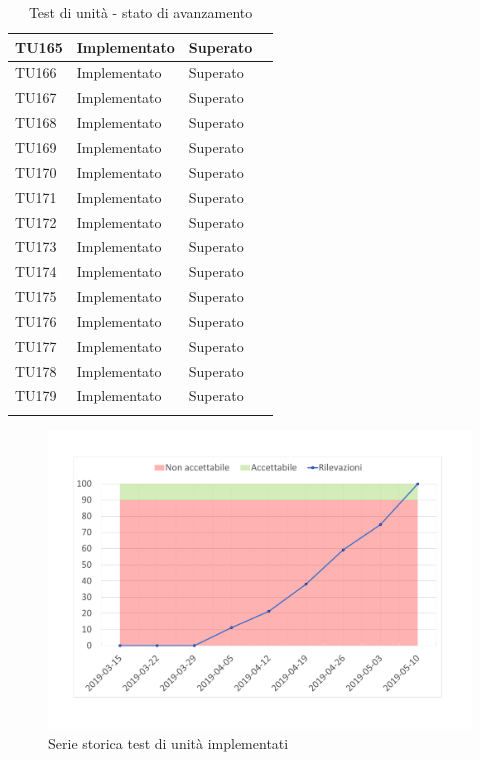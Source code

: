 \begin{longtable}{|>{\centering\arraybackslash}m{1.6cm}|>{\centering\arraybackslash}m{6.41cm}|>{\centering\arraybackslash}m{3.1cm}| c |}
	\rowcolor{LightGray}
	TU165 & Implementato & Superato  \\ \hline
	TU166 & Implementato & Superato  \\ \hline
	\rowcolor{LightGray}
	TU167 & Implementato & Superato  \\ \hline
	TU168 & Implementato & Superato  \\ \hline
	\rowcolor{LightGray}
	TU169 & Implementato & Superato  \\ \hline
	TU170 & Implementato & Superato  \\ \hline
	\rowcolor{LightGray}
	TU171 & Implementato & Superato  \\ \hline
	TU172 & Implementato & Superato  \\ \hline
	\rowcolor{LightGray}
	TU173 & Implementato & Superato  \\ \hline
	TU174 & Implementato & Superato  \\ \hline
	\rowcolor{LightGray}
	TU175 & Implementato & Superato  \\ \hline
	TU176 & Implementato & Superato  \\ \hline
	\rowcolor{LightGray}
	TU177 & Implementato & Superato  \\ \hline
	TU178 & Implementato & Superato  \\ \hline
	\rowcolor{LightGray}
	TU179 & Implementato & Superato  \\ \hline
	\caption{Test di unità - stato di avanzamento}
\end{longtable}

\begin{figure}[H]
	\centering
	\includegraphics[scale=0.6]{images/resoconto/MPC6Chart.pdf}
	\caption{Serie storica test di unità implementati}	
\end{figure}

